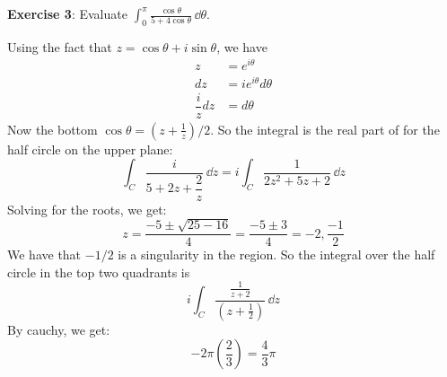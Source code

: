 \documentclass{article}
\begin{document}
\textbf{Exercise 3}: Evaluate $\int_{0}^{\pi} \frac{\cos{\theta}}{5 + 4 \cos{\theta}} \, \dd{\theta} $.
    \begin{answer}
        Using the fact that $z = \cos{\theta} + i\sin{\theta}$, we have
            \begin{align*}
                z              &= e^{i\theta}         \\
                dz             &= ie^{i\theta}d\theta \\
                \dfrac{i}{z}dz &= d\theta               
            \end{align*}
        Now the bottom $\cos{\theta} = (z + \frac{1}{z})/2$. So the integral is the real part of for the half circle on the upper plane:
            \begin{equation*}
                \int_{C}^{} \dfrac{i}{5 + 2z + \dfrac{2}{z}} \, \dd{z}  = i\int_{C}^{} \dfrac{1}{2z^{2} + 5z + 2} \, \dd{z}
            \end{equation*}
        Solving for the roots, we get:
            \begin{equation*}
                z = \dfrac{-5 \pm \sqrt{25 - 16}}{4} = \dfrac{-5 \pm 3}{4} = -2, \dfrac{-1}{2}
            \end{equation*}
        We have that $-1/2$ is a singularity in the region. So the integral over the half circle in the top two quadrants is 
            \begin{equation*}
                i\int_{C}^{} \dfrac{\frac{1}{z + 2}}{(z + \frac{1}{2})} \, \dd{z}
            \end{equation*}
        By cauchy, we get:
            \begin{equation*}
                -2\pi (\dfrac{2}{3}) = \dfrac{4}{3}\pi
            \end{equation*}
    \end{answer}

\newpage
\end{document}
